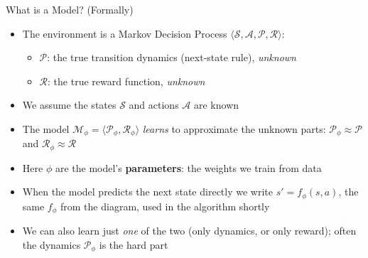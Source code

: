 \begin{frame}{What is a Model? (Formally)}
\begin{itemize}
    \item The environment is a Markov Decision Process
          $\langle \mathcal{S}, \mathcal{A}, \mathcal{P}, \mathcal{R} \rangle$:
    \begin{itemize}
        \item $\mathcal{P}$: the true transition dynamics (next-state rule),
              \emph{unknown}
        \item $\mathcal{R}$: the true reward function, \emph{unknown}
    \end{itemize}
    \item We assume the states $\mathcal{S}$ and actions $\mathcal{A}$ are known
    \item The model $\mathcal{M}_\phi = \langle \mathcal{P}_\phi, \mathcal{R}_\phi \rangle$
          \emph{learns} to approximate the unknown parts:
          $\mathcal{P}_\phi \approx \mathcal{P}$ and $\mathcal{R}_\phi \approx \mathcal{R}$
    \item Here $\phi$ are the model's \textbf{parameters}: the weights we train
          from data
    \item When the model predicts the next state directly we write
          $s' = f_\phi(s, a)$, the same $f_\phi$ from the diagram, used in the
          algorithm shortly
    \item We can also learn just \emph{one} of the two (only dynamics, or only
          reward); often the dynamics $\mathcal{P}_\phi$ is the hard part
\end{itemize}
\end{frame}
